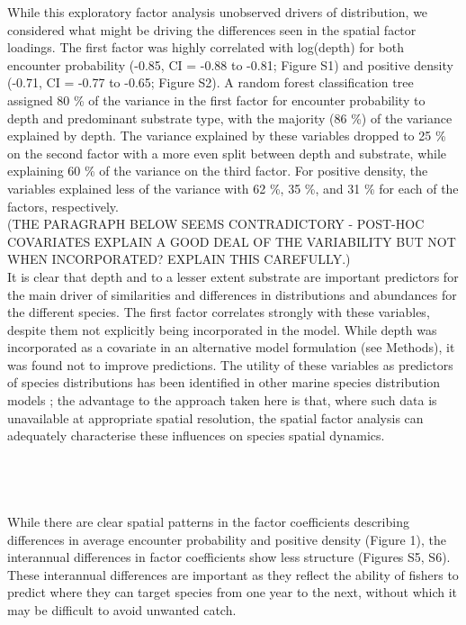 \documentclass[fleqn,10pt]{wlscirep}
\begin{document}
\begin{linenumbers}
While this exploratory factor analysis  unobserved drivers of
distribution, we considered what might be driving the differences seen in the
spatial factor  loadings. The first
factor was highly correlated with log(depth) for both 
encounter probability  (-0.85, CI = -0.88 to -0.81;
Figure S1) and  positive density
 (-0.71, CI = -0.77 to -0.65; Figure S2). A random
forest classification tree assigned 80 \% of the variance in the first factor
for  encounter probability to depth and predominant
substrate type, with the majority (86 \%) of the variance explained by depth.
The variance explained by these variables dropped to 25 \% on the second factor
with a more even split between depth and substrate, while explaining 60 \% of
the variance on the third factor.  For  positive density,
the variables explained less of the variance with 62 \%, 35 \%, and 31 \% for
each of the factors, respectively.\\
(THE PARAGRAPH BELOW SEEMS CONTRADICTORY - POST-HOC COVARIATES EXPLAIN A GOOD DEAL OF THE VARIABILITY BUT NOT WHEN INCORPORATED? EXPLAIN THIS CAREFULLY.)\\
It is clear that depth and to a lesser extent substrate are important
predictors for the main driver of similarities and differences in distributions
and abundances for the different species. The first factor correlates
strongly with these variables, despite them not explicitly being incorporated
in the model. While depth was incorporated as a covariate in an alternative
model formulation (see Methods), it was found not to improve predictions. The
utility of these variables as predictors of species distributions has been
identified in other marine species distribution models \cite{Robinson2011}; the
advantage to the approach taken here is that, where such data is unavailable at
appropriate spatial resolution, the spatial factor analysis can adequately
characterise these influences on species spatial dynamics.\\

\subsection*{\\} 
While there are clear spatial patterns in the factor coefficients describing
differences in average  encounter probability and
positive density (Figure 1), the interannual differences in factor coefficients
show less structure (Figures S5, S6). These interannual differences are
important as they reflect the ability of fishers to predict where they can
target  species from one year to the next, without which
it may be difficult to 
avoid unwanted catch.\\


\end{linenumbers}
\end{document}
